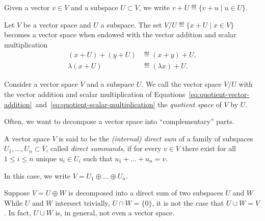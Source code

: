 \documentclass[a4paper,oneside, 12pt]{amsart}
\begin{document}
Given a vector \(v\in V\) and a subspace \(U \subset V\), we write \(v+U\eqdef\{v+u \mid u \in U\}\).

\begin{proposition}\label{prop:quotients-are-vs}
  Let \(V\) be a vector space and \(U\) a subspace.
  The set \(V/U \eqdef\{x+ U \mid x \in V\}\) becomes a vector space when endowed with the vector addition and scalar multiplication
  \begin{subequations}
    \begin{align}
      (x+U) + (y+ U) &\eqdef (x+y) +U, \label{eq:quotient-vector-addition} \\
      \lambda(x + U) &\eqdef (\lambda x) + U. \label{eq:quotient-scalar-multiplication}
    \end{align}
  \end{subequations}
\end{proposition}

\begin{definition}\label{def:quotient-vs}
  Consider a vector space \(V\) and a subspace \(U\).
  We call the vector space \(V/U\) with the vector addition and scalar multiplication of Equations~\eqref{eq:quotient-vector-addition}~and~\eqref{eq:quotient-scalar-multiplication} the \emph{quotient space} of \(V\) by \(U\).
\end{definition}

Often, we want to decompose a vector space into ``complementary'' parts.

\begin{definition}\label{def:direct-sum}
  A vector space \(V\) is said to be the \emph{(internal) direct sum} of a family of subspaces \(U_{1}, \dots , U_{n} \subset V\), called \emph{direct summands}, if for every \(v\in V\) there exist for all \(1 \leq i \leq n\) unique \(u_{i}\in U_{i}\)  such that \(u_{1}+ \dots + u_{n} = v\).

  In this case, we write \(V= U_{1} \oplus  \dots \oplus U_{n}\).
\end{definition}

Suppose \(V = U \oplus W\) is decomposed into a direct sum of two subspaces \(U\) and \(W\)
While  \(U\) and \(W\) intersect trivially, \ie \(U\cap W = \{0\}\), it is not the case that \(U \cup W = V\).
In fact, \(U \cup W\) is, in general, not even a vector space.
\end{document}
